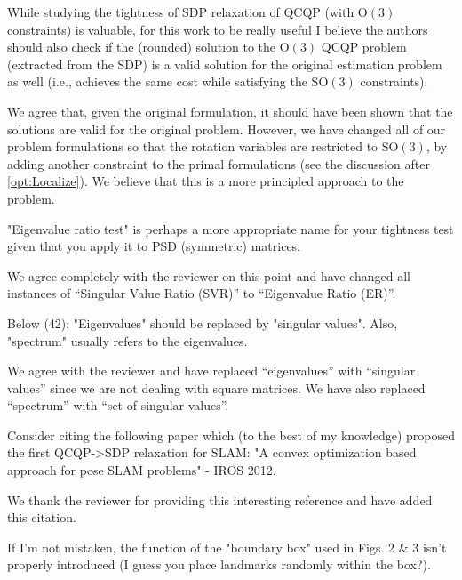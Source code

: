 While studying the tightness of SDP relaxation of QCQP (with $ \mbox{O}(3) $ constraints) is valuable, for this work to be really useful I believe the authors should also check if the (rounded) solution to the $ \mbox{O}(3) $ QCQP problem (extracted from the SDP) is a valid  solution for the original estimation problem as well (i.e., achieves the same cost while satisfying the $ \mbox{SO}(3) $ constraints).

\begin{response}
We agree that, given the original formulation, it should have been shown that the solutions are valid for the original problem. However, we have changed all of our problem formulations so that the rotation variables are restricted to $ \mbox{SO}(3) $, by adding another constraint to the primal formulations (see the discussion after \eqref{opt:Localize}). We believe that this is a more principled approach to the problem.
\end{response}

"Eigenvalue ratio test" is perhaps a more appropriate name for your tightness test given that you apply it to PSD (symmetric) matrices.

\begin{response}
We agree completely with the reviewer on this point and have changed all instances of ``Singular Value Ratio (SVR)'' to ``Eigenvalue Ratio (ER)''.
\end{response}

Below (42): "Eigenvalues" should be replaced by "singular values". Also, "spectrum" usually refers to the eigenvalues. 

\begin{response}
We agree with the reviewer and have replaced ``eigenvalues'' with ``singular values'' since we are not dealing with square matrices. We have also replaced ``spectrum'' with ``set of singular values''.
\end{response}

Consider citing the following paper which (to the best of my knowledge) proposed the first QCQP->SDP relaxation for SLAM: "A convex optimization based approach for pose SLAM problems" - IROS 2012.
\begin{response} 
We thank the reviewer for providing this interesting reference and have added this citation.
\end{response}

If I'm not mistaken, the function of the "boundary box" used in Figs. 2 \& 3 isn't properly introduced (I guess you place landmarks randomly within the box?). 

